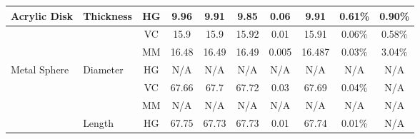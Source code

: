 \begin{table}[h!]
{\begin{tabular}{|l|l|cccc|c|c|c|c|}
			\multirow{-6}{*}{Acrylic Disk}    & \multirow{-3}{*}{Thickness}      & \multicolumn{1}{c|}{HG}                & \multicolumn{1}{c|}{9.96}                        & \multicolumn{1}{c|}{9.91}                        & 9.85                        & 0.06                        & 9.91                        & 0.61\%                      & 0.90\%                      \\ \hline
			                                  &                                  & \multicolumn{1}{c|}{VC}                & \multicolumn{1}{c|}{15.9}                        & \multicolumn{1}{c|}{15.9}                        & 15.92                       & 0.01                        & 15.91                       & 0.06\%                      & 0.58\%                      \\ \cline{3-10}
			                                  &                                  & \multicolumn{1}{c|}{MM}                & \multicolumn{1}{c|}{16.48}                       & \multicolumn{1}{c|}{16.49}                       & 16.49                       & 0.005                       & 16.487                      & 0.03\%                      & 3.04\%                      \\ \cline{3-10}
			\multirow{-3}{*}{Metal Sphere}    & \multirow{-3}{*}{Diameter}       & \multicolumn{1}{c|}{HG}                & \multicolumn{1}{c|}{\cellcolor[HTML]{FF0000}N/A} & \multicolumn{1}{c|}{\cellcolor[HTML]{FF0000}N/A} & \cellcolor[HTML]{FF0000}N/A & \cellcolor[HTML]{FF0000}N/A & \cellcolor[HTML]{FF0000}N/A & \cellcolor[HTML]{FF0000}N/A & \cellcolor[HTML]{FF0000}N/A \\ \hline
			                                  &                                  & \multicolumn{1}{c|}{VC}                & \multicolumn{1}{c|}{67.66}                       & \multicolumn{1}{c|}{67.7}                        & 67.72                       & 0.03                        & 67.69                       & 0.04\%                      & \cellcolor[HTML]{FF0000}N/A \\ \cline{3-10}
			                                  &                                  & \multicolumn{1}{c|}{MM}                & \multicolumn{1}{c|}{\cellcolor[HTML]{FF0000}N/A} & \multicolumn{1}{c|}{\cellcolor[HTML]{FF0000}N/A} & \cellcolor[HTML]{FF0000}N/A & \cellcolor[HTML]{FF0000}N/A & \cellcolor[HTML]{FF0000}N/A & \cellcolor[HTML]{FF0000}N/A & \cellcolor[HTML]{FF0000}N/A \\ \cline{3-10}
			                                  & \multirow{-3}{*}{Length}         & \multicolumn{1}{c|}{HG}                & \multicolumn{1}{c|}{67.75}                       & \multicolumn{1}{c|}{67.73}                       & 67.73                       & 0.01                        & 67.74                       & 0.01\%                      & \cellcolor[HTML]{FF0000}N/A \\ \cline{2-10}

\end{tabular}}
\end{table}
